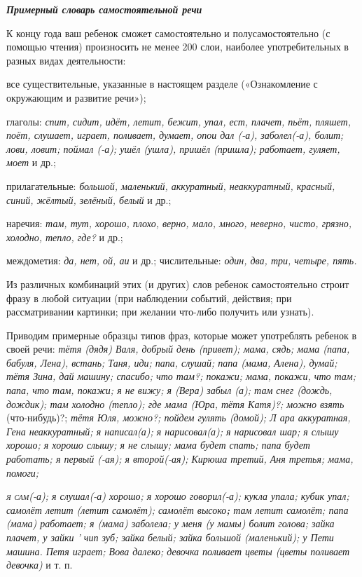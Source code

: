 \documentclass[a5paper]{book}
\renewcommand{\emph}[1]{\textit{#1}}
\begin{document}
\emph{\textbf{Примерный словарь самостоятельной речи}}

К концу года ваш ребенок сможет самостоятельно и полусамостоятельно (с
помощью чтения) произносить не менее 200 слои, наиболее употребительных
в разных видах деятельности:

все существительные, указанные в настоящем разделе («Ознакомление с
окружающим и развитие речи»);

глаголы: \emph{спит, сидит, идёт, летит, бежит, упал, ест, плачет, пьёт,
пляшет, поёт, слушает, играет, поливает, думает, опои дал (-а),
заболел(-а), болит; лови, ловит; поймал (-а); ушёл (ушла), пришёл
(пришла); работает, гуляет, моет} и др.;

прилагательные: \emph{большой, маленький, аккуратный, неаккуратный,
красный, синий, жёлтый, зелёный, белый} и др.;

наречия: \emph{там, тут, хорошо, плохо, верно, мало, много, неверно,
чисто, грязно, холодно, тепло, где?} и др.;

междометия: \emph{да, нет, ой, аи} и др.; числительные: \emph{один, два,
три, четыре, пять.}

Из различных комбинаций этих (и других) слов ребенок самостоятельно
строит фразу в любой ситуации (при наблюдении событий, действия; при
рассматривании картинки; при желании что-либо получить или узнать).

Приводим примерные образцы типов фраз, которые может употреблять ребенок
в своей речи: \emph{тётя (дядя) Валя, добрый день (привет); мама, сядь;
мама (папа, бабуля, Лена), встань; Таня, иди; папа, слушай; папа (мама,
Алена), думай; тётя Зина, дай машину; спасибо; что там?; покажи; мама,
покажи, что там; папа, что там, покажи; я не вижу; я (Вера) забыл (а);
там снег (дождь, дождик); там холодно (тепло); где мама (Юра, тётя
Катя)?; можно взять} (что-нибудь)?; \emph{тётя Юля, можно?; пойдем
гулять (домой); Л ара аккуратная, Гена неаккуратный; я написал(а); я
нарисовал(а); я нарисовал шар; я слышу хорошо; я хорошо слышу; я не
слышу; мама будет спать; папа будет работать; я первый (-ая); я
второй(-ая); Кирюша третий, Аня третья; мама, помоги;}

\emph{\textsc{я сам}(-а); я слушал(-а) хорошо; я хорошо говорил(-а);
кукла упала; кубик упал; самолёт летит (летит самолёт); самолёт
высоко\textbf{;} там летит самолёт; папа (мама) работает; я (мама)
заболела; у меня (у мамы) болит голова; зайка плачет, у зайки ' чип зуб;
зайка белый; зайка большой (маленький); у Пети машина. Петя играет; Вова
далеко; девочка поливает цветы (цветы поливает девочка)} и т. п.
\end{document}
